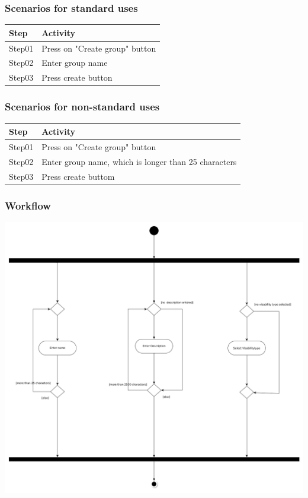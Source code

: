 \documentclass[12pt]{scrartcl}
\begin{document}
    \subsubsection{Scenarios for standard uses}
        \begin{tabular}{|l|l|}
            \hline
            Step & Activity \\ \hline
            Step01 & Press on "Create group" button\\ \hline
            Step02 & Enter group name \\ \hline
            Step03 & Press create button \\ \hline
        \end{tabular}
    \subsubsection{Scenarios for non-standard uses}
        \begin{tabular}{|l|l|}
            \hline
            Step & Activity \\ \hline
            Step01 & Press on "Create group" button\\ \hline
            Step02 & Enter group name, which is longer than 25 characters \\ \hline
            Step03 & Press create buttom \\ \hline
        \end{tabular}
    \subsubsection{Workflow}
        \includegraphics[scale=.4]{Materials/Images/manage_group_workflow.png}
        
\end{document}
